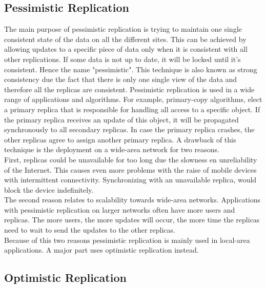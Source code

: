 \documentclass[a4paper,12pt]{report}
\begin{document}
\subsection{Pessimistic Replication}

The main purpose of pessimistic replication is trying to maintain one single consistent state of the data on all the different sites. This can be achieved by allowing updates to a specific piece of data only when it is consistent with all other replications. If some data is not up to date, it will be locked until it's consistent. Hence the name "pessimistic". This technique is also known as strong consistency due the fact that there is only one single view of the data and therefore all the replicas are consistent. Pessimistic replication is used in a wide range of applications and algorithms. For example, primary-copy algorithms, elect a primary replica that is responsible for handling all access to a specific object. If the primary replica receives an update of this object, it will be propagated synchronously to all secondary replicas. In case the primary replica crashes, the other replicas agree to assign another primary replica. A drawback of this technique is the deployment on a wide-area network for two reasons. \\
\indent First, replicas could be unavailable for too long due the slowness en unreliability of the Internet. This causes even more problems with the raise of mobile devices with intermittent connectivity. Synchronizing with an unavailable replica, would block the device indefinitely. \\
\indent The second reason relates to scalability towards wide-area networks. Applications with pessimistic replication on larger networks often have more users and replicas. The more users, the more updates will occur, the more time the replicas need to wait to send the updates to the other replicas. \\
Because of this two reasons pessimistic replication is mainly used in local-area applications. A major part uses optimistic replication instead.

\subsection{Optimistic Replication}
\end{document}

